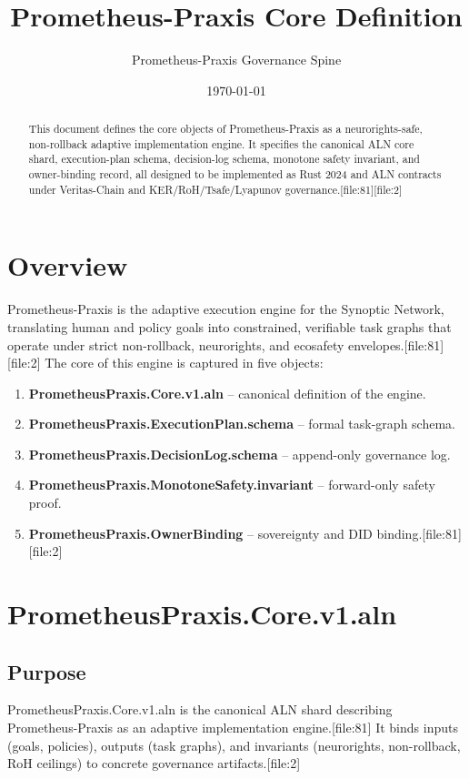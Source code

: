 \documentclass[11pt]{article}
\title{Prometheus-Praxis Core Definition}
\author{Prometheus-Praxis Governance Spine}
\date{\today}
\begin{document}
\maketitle

\begin{abstract}
This document defines the core objects of Prometheus-Praxis as a neurorights-safe, non-rollback adaptive implementation engine. It specifies the canonical ALN core shard, execution-plan schema, decision-log schema, monotone safety invariant, and owner-binding record, all designed to be implemented as Rust 2024 and ALN contracts under Veritas-Chain and KER/RoH/Tsafe/Lyapunov governance.[file:81][file:2]
\end{abstract}

\section{Overview}

Prometheus-Praxis is the adaptive execution engine for the Synoptic Network, translating human and policy goals into constrained, verifiable task graphs that operate under strict non-rollback, neurorights, and ecosafety envelopes.[file:81][file:2]
The core of this engine is captured in five objects:

\begin{enumerate}[nosep]
  \item \textbf{PrometheusPraxis.Core.v1.aln} -- canonical definition of the engine.
  \item \textbf{PrometheusPraxis.ExecutionPlan.schema} -- formal task-graph schema.
  \item \textbf{PrometheusPraxis.DecisionLog.schema} -- append-only governance log.
  \item \textbf{PrometheusPraxis.MonotoneSafety.invariant} -- forward-only safety proof.
  \item \textbf{PrometheusPraxis.OwnerBinding} -- sovereignty and DID binding.[file:81][file:2]
\end{enumerate}

\section{PrometheusPraxis.Core.v1.aln}

\subsection{Purpose}

PrometheusPraxis.Core.v1.aln is the canonical ALN shard describing Prometheus-Praxis as an adaptive implementation engine.[file:81]
It binds inputs (goals, policies), outputs (task graphs), and invariants (neurorights, non-rollback, RoH ceilings) to concrete governance artifacts.[file:2]
\end{document}

